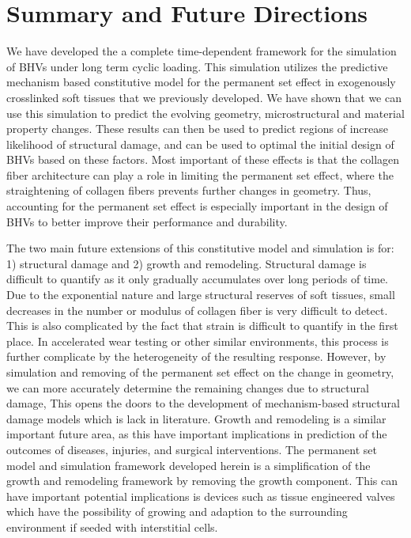 \section{Summary and Future Directions}
	We have developed the a complete time-dependent framework for the simulation of BHVs under long term cyclic loading. This simulation utilizes the predictive mechanism based constitutive model for the permanent set effect in exogenously crosslinked soft tissues that we previously developed. We have shown that we can use this simulation to predict the evolving geometry, microstructural and material property changes. These results can then be used to predict regions of increase likelihood of structural damage, and can be used to optimal the initial design of BHVs based on these factors. Most important of these effects is that the collagen fiber architecture can play a role in limiting the permanent set effect, where the straightening of collagen fibers prevents further changes in geometry. Thus, accounting for the permanent set effect is especially important in the design of BHVs to better improve their performance and durability. 
	
	
	The two main future extensions of this constitutive model and simulation is for: 1) structural damage and 2) growth and remodeling. Structural damage is difficult to quantify as it only gradually accumulates over long periods of time. Due to the exponential nature and large structural reserves of soft tissues, small decreases in the number or modulus of collagen fiber is very difficult to detect. This is also complicated by the fact that strain is difficult to quantify in the first place. In accelerated wear testing or other similar environments, this process is further complicate by the heterogeneity of the resulting response. However, by simulation and removing of the permanent set effect on the change in geometry, we can more accurately determine the remaining changes due to structural damage, This opens the doors to the development of mechanism-based structural damage models which is lack in literature. Growth and remodeling is a similar important future area, as this have important implications in prediction of the outcomes of diseases, injuries, and surgical interventions. The permanent set model and simulation framework developed herein is a simplification of the growth and remodeling framework by removing the growth component. This can have important potential implications is devices such as tissue engineered valves which have the possibility of growing and adaption to the surrounding environment if seeded with interstitial cells. 